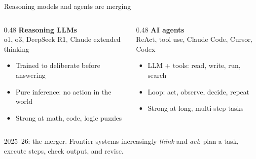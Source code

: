 \documentclass[aspectratio=169,11pt]{beamer}
\begin{document}
\begin{frame}{Reasoning models and agents are merging}

\begin{columns}[T]
\begin{column}{0.48\textwidth}
\textbf{Reasoning LLMs} \\
\textcolor{warmgray}{\scriptsize o1, o3, DeepSeek R1, Claude extended thinking}

\vspace{0.25cm}
\begin{itemize}\setlength\itemsep{0.15em}
    \item Trained to deliberate before answering
    \item Pure inference: no action in the world
    \item Strong at math, code, logic puzzles
\end{itemize}
\end{column}

\begin{column}{0.48\textwidth}
\textbf{AI agents} \\
\textcolor{warmgray}{\scriptsize ReAct, tool use, Claude Code, Cursor, Codex}

\vspace{0.25cm}
\begin{itemize}\setlength\itemsep{0.15em}
    \item LLM + tools: read, write, run, search
    \item Loop: act, observe, decide, repeat
    \item Strong at long, multi-step tasks
\end{itemize}
\end{column}
\end{columns}

\vspace{0.4cm}

\alert{2025--26: the merger.} Frontier systems increasingly \emph{think} and \emph{act}: plan a task, execute steps, check output, and revise.

\end{frame}
\end{document}
